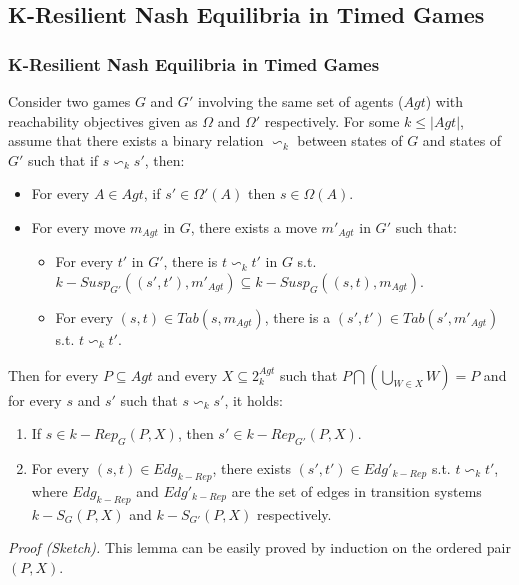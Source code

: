 \documentclass{beamer}
\newcommand\Fontvi{\fontsize{7}{5}\selectfont}
\begin{document}
\subsection*{K-Resilient Nash Equilibria in Timed Games}
\begin{frame}
\frametitle{K-Resilient Nash Equilibria in Timed Games}
\Fontvi
\begin{lemma}[7]
\Fontvi
Consider two games $G$ and $G'$ involving the same set of agents ($Agt$) with reachability objectives given as $\Omega$ and $\Omega'$ respectively. For some $k \leq \vert Agt \vert$, assume that there exists a binary relation $\backsim_{k}$ between states of $G$ and states of $G'$ such that if $s \backsim_{k} s'$, then:
\begin{itemize}
\Fontvi
\item For every $A \in Agt$, if $s' \in \Omega'(A)$ then $s \in \Omega(A)$.
\item For every move $m_{Agt}$ in $G$, there exists a move $m'_{Agt}$ in $G'$ such that:
\begin{itemize}
\Fontvi
\item For every $t'$ in $G'$, there is $t \backsim_{k} t'$ in $G$ s.t. $k-Susp_{G'}((s', t'), m'_{Agt}) \subseteq k-Susp_{G}((s, t), m_{Agt})$.
\item For every $(s, t) \in Tab(s, m_{Agt})$, there is a $(s', t') \in Tab(s', m'_{Agt})$ s.t. $t \backsim_{k} t'$.
\end{itemize}
\end{itemize}
Then for every $P \subseteq Agt$ and every $X \subseteq 2^{Agt}_{k}$ such that $P \bigcap \left( \bigcup \limits_{W \in X}W \right) = P$ and for every $s$ and $s'$ such that $s \backsim_{k} s'$, it holds:
\begin{enumerate}
\Fontvi
\item If $s \in k-Rep_{G}(P, X)$, then $s' \in k-Rep_{G'}(P, X)$.
\item For every $(s, t) \in Edg_{k-Rep}$, there exists $(s', t') \in Edg'_{k-Rep}$ s.t. $t \backsim_{k} t'$, where $Edg_{k-Rep}$ and $Edg'_{k-Rep}$ are the set of edges in transition systems $k-S_{G}(P, X)$ and $k-S_{G'}(P, X)$ respectively.
\end{enumerate}
\end{lemma}
\textit{Proof (Sketch).} This lemma can be easily proved by induction on the ordered pair $(P, X)$.
\end{frame}
\end{document}
